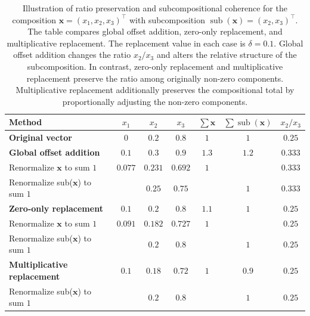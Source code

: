 \begin{table}[!htb]
\centering
\caption{Illustration of ratio preservation and subcompositional coherence for the composition $\mathbf{x}=(x_1,x_2,x_3)^\top$ with subcomposition $\operatorname{sub}(\mathbf{x})=(x_2,x_3)^\top$. The table compares global offset addition, zero-only replacement, and multiplicative replacement. The replacement value in each case is $\delta = 0.1$. Global offset addition changes the ratio $x_2/x_3$ and alters the relative structure of the subcomposition. In contrast, zero-only replacement and multiplicative replacement preserve the ratio among originally non-zero components. Multiplicative replacement additionally preserves the compositional total by proportionally adjusting the non-zero components.}
\label{tab:zero_replacement}
\small
\setlength{\tabcolsep}{8pt}
\renewcommand{\arraystretch}{1.15}
\begin{tabular}{l|ccc|cc|c}
\textbf{Method} & ${x_1}$ & ${x_2}$ & ${x_3}$ & ${\sum \mathbf{x}}$ & ${\sum \operatorname{sub}(\mathbf{x})}$ & ${x_2/x_3}$  \\
\hline\hline
\textbf{Original vector} & $0$ & $0.2$ & $0.8$ & $1$ & $1$ & $0.25$\\
\hline
\textbf{Global offset addition} & $0.1$ & $0.3$ & $0.9$ & $1.3$ & $1.2$ & $0.333$ \\
Renormalize $\mathbf{x}$ to sum $1$ & $0.077$ & $0.231$ & $0.692$ & $1$ & ~ & $0.333$ \\
Renormalize sub($\mathbf{x}$) to sum $1$ & ~ & $0.25$ & $0.75$ & ~ & $1$ & $0.333$ \\
\hline
\textbf{Zero-only replacement} & $0.1$ & $0.2$ & $0.8$ & $1.1$ & $1$ & $0.25$ \\
Renormalize $\mathbf{x}$ to sum $1$ & $0.091$ & $0.182$ & $0.727$ & $1$ & ~ & $0.25$  \\
Renormalize sub($\mathbf{x}$) to sum $1$ & ~ & $0.2$ & $0.8$ & ~ & $1$ & $0.25$ \\
\hline
\textbf{Multiplicative replacement} & $0.1$ & $0.18$ & $0.72$ & $1$ & $0.9$& $0.25$ \\
Renormalize sub($\mathbf{x}$) to sum $1$ & ~ & $0.2$ & $0.8$ & ~ & $1$ & $0.25$ \\
\end{tabular}
\end{table}

